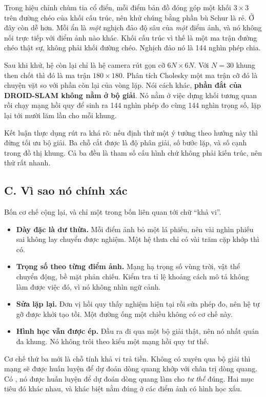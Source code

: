 \documentclass[../../deep_learning.tex]{subfiles}
\begin{document}
Trong hiệu chỉnh chùm tia cổ điển, mỗi điểm bản đồ đóng góp một khối \(3\times3\) trên đường chéo của khối cấu trúc, nên khử chúng bằng phần bù Schur là rẻ. Ở đây còn dễ hơn. Mỗi ẩn là \emph{một} nghịch đảo độ sâu của \emph{một} điểm ảnh, và nó không nối trực tiếp với điểm ảnh nào khác. Khối cấu trúc vì thế là một ma trận đường chéo thật sự, không phải khối đường chéo. Nghịch đảo nó là 144 nghìn phép chia.

Sau khi khử, hệ còn lại chỉ là hệ camera rút gọn cỡ \(6N\times6N\). Với \(N=30\) khung then chốt thì đó là ma trận \(180\times180\). Phân tích Cholesky một ma trận cỡ đó là chuyện vặt so với phần còn lại của vòng lặp. Nói cách khác, \textbf{phần đắt của DROID-SLAM không nằm ở bộ giải}. Nó nằm ở việc dựng khối tương quan rồi chạy mạng hồi quy để sinh ra 144 nghìn phép đo cùng 144 nghìn trọng số, lặp lại tới mười lăm lần cho mỗi khung.

Kết luận thực dụng rút ra khá rõ: nếu định thử một ý tưởng theo hướng này thì đừng tối ưu bộ giải. Ba chỗ cắt được là độ phân giải, số bước lặp, và số cạnh trong đồ thị khung. Cả ba đều là tham số cấu hình chứ không phải kiến trúc, nên thử rất nhanh.

\subsection{C. Vì sao nó chính xác}
Bốn cơ chế cộng lại, và chỉ một trong bốn liên quan tới chữ ``khả vi''.

\begin{itemize}
\item \textbf{Dày đặc là dư thừa.} Mỗi điểm ảnh bỏ một lá phiếu, nên vài nghìn phiếu sai không lay chuyển được nghiệm. Một hệ thưa chỉ có vài trăm cặp khớp thì có.
\item \textbf{Trọng số theo từng điểm ảnh.} Mạng hạ trọng số vùng trời, vật thể chuyển động, bề mặt phản chiếu. Kiểm tra tỉ lệ khoảng cách mô tả không làm được việc đó, vì nó không nhìn ngữ cảnh.
\item \textbf{Sửa lặp lại.} Đơn vị hồi quy thấy nghiệm hiện tại rồi sửa phép đo, nên hệ tự gỡ được khởi tạo tồi. Một đường ống một chiều không có cơ chế này.
\item \textbf{Hình học vẫn được ép.} Đầu ra đi qua một bộ giải thật, nên nó nhất quán đa khung. Nó không trôi theo kiểu một mạng hồi quy tư thế.
\end{itemize}

Cơ chế thứ ba mới là chỗ tính khả vi trả tiền. Không có  xuyên qua bộ giải thì mạng sẽ được huấn luyện để dự đoán dòng quang khớp với chân trị dòng quang. Có , nó được huấn luyện để dự đoán dòng quang làm cho \emph{tư thế} đúng. Hai mục tiêu đó khác nhau, và khác biệt nằm đúng ở các điểm ảnh có hình học xấu.
\end{document}
